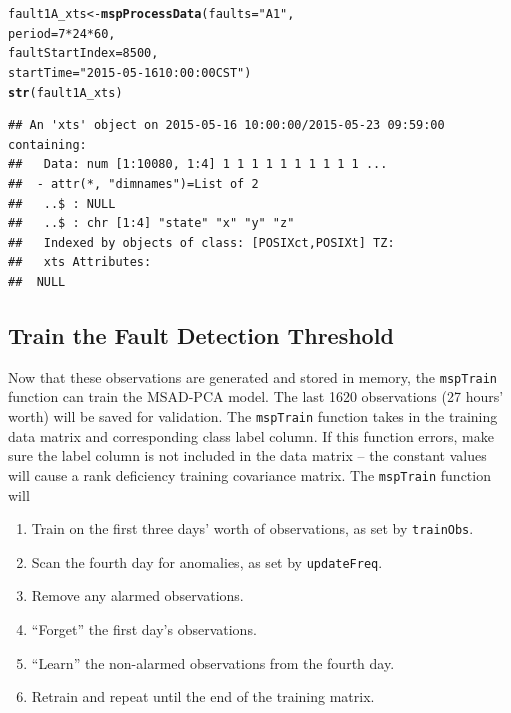 \documentclass{report}\usepackage[]{graphicx}\usepackage[]{color}
\makeatletter
\newcommand{\hlnum}[1]{\textcolor[rgb]{0.686,0.059,0.569}{#1}}%
\newcommand{\hlstr}[1]{\textcolor[rgb]{0.192,0.494,0.8}{#1}}%
\newcommand{\hlopt}[1]{\textcolor[rgb]{0,0,0}{#1}}%
\newcommand{\hlstd}[1]{\textcolor[rgb]{0.345,0.345,0.345}{#1}}%
\newcommand{\hlkwb}[1]{\textcolor[rgb]{0.69,0.353,0.396}{#1}}%
\newcommand{\hlkwc}[1]{\textcolor[rgb]{0.333,0.667,0.333}{#1}}%
\newcommand{\hlkwd}[1]{\textcolor[rgb]{0.737,0.353,0.396}{\textbf{#1}}}%
\newenvironment{kframe}{%
 \def\at@end@of@kframe{}%
 \ifinner\ifhmode%
  \def\at@end@of@kframe{\end{minipage}}%
  \begin{minipage}{\columnwidth}%
 \fi\fi%
 \def\FrameCommand##1{\hskip\@totalleftmargin \hskip-\fboxsep
 \colorbox{shadecolor}{##1}\hskip-\fboxsep
     \hskip-\linewidth \hskip-\@totalleftmargin \hskip\columnwidth}%
 \MakeFramed {\advance\hsize-\width
   \@totalleftmargin\z@ \linewidth\hsize
   \@setminipage}}%
 {\par\unskip\endMakeFramed%
 \at@end@of@kframe}
\newenvironment{knitrout}{}{} %
\makeatother
\begin{document}
\begin{knitrout}
\color{fgcolor}\begin{kframe}
\begin{alltt}
\hlstd{fault1A_xts} \hlkwb{<-} \hlkwd{mspProcessData}\hlstd{(}\hlkwc{faults} \hlstd{=} \hlstr{"A1"}\hlstd{,}
                              \hlkwc{period} \hlstd{=} \hlnum{7} \hlopt{*} \hlnum{24} \hlopt{*} \hlnum{60}\hlstd{,}
                              \hlkwc{faultStartIndex} \hlstd{=} \hlnum{8500}\hlstd{,}
                              \hlkwc{startTime} \hlstd{=} \hlstr{"2015-05-16 10:00:00 CST"}\hlstd{)}
\hlkwd{str}\hlstd{(fault1A_xts)}
\end{alltt}
\begin{verbatim}
## An 'xts' object on 2015-05-16 10:00:00/2015-05-23 09:59:00 containing:
##   Data: num [1:10080, 1:4] 1 1 1 1 1 1 1 1 1 1 ...
##  - attr(*, "dimnames")=List of 2
##   ..$ : NULL
##   ..$ : chr [1:4] "state" "x" "y" "z"
##   Indexed by objects of class: [POSIXct,POSIXt] TZ:
##   xts Attributes:
##  NULL
\end{verbatim}
\end{kframe}
\end{knitrout}


\subsection{Train the Fault Detection Threshold}
Now that these observations are generated and stored in memory, the \texttt{mspTrain} function can train the MSAD-PCA model. The last 1620 observations (27 hours' worth) will be saved for validation. The \texttt{mspTrain} function takes in the training data matrix and corresponding class label column. If this function errors, make sure the label column is not included in the data matrix -- the constant values will cause a rank deficiency training covariance matrix. The \texttt{mspTrain} function will
\begin{enumerate}
\item Train on the first three days' worth of observations, as set by \texttt{trainObs}.
%
\item Scan the fourth day for anomalies, as set by \texttt{updateFreq}.
%
\item Remove any alarmed observations.
%
\item ``Forget'' the first day's observations.
%
\item ``Learn'' the non-alarmed observations from the fourth day.
%
\item Retrain and repeat until the end of the training matrix.
\end{enumerate}
\end{document}
